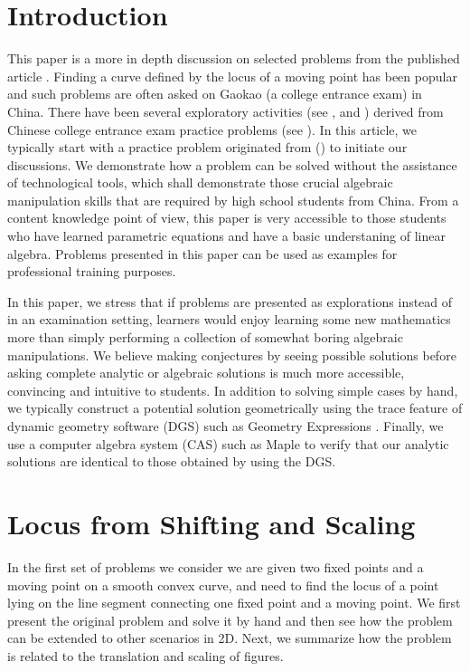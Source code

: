 \documentclass[12pt,a4paper]{article}%
\begin{document}
\section{Introduction} \label{sec1}

This paper is a more in depth discussion on selected problems from the
published article \cite{ATCM2018}. Finding a curve defined by the locus of a
moving point has been popular and such problems are often asked on Gaokao (a college entrance
exam) in China. There have been several exploratory activities (see
\cite{June2017} \cite{MacandYang}, and \cite{YangandS}) derived from Chinese
college entrance exam practice problems (see \cite{Gao}). In this article, we
typically start with a practice problem originated from (\cite{Gao}) to
initiate our discussions. We demonstrate how a problem can be solved without
the assistance of technological tools, which shall demonstrate those crucial
algebraic manipulation skills that are required by high school students from
China. From a content knowledge point of view, this paper is very accessible to
those students who have learned parametric equations and have a basic understaning of
linear algebra. Problems presented in this paper can be used as examples for
professional training purposes.

In this paper, we stress that if problems are presented as explorations instead
of in an examination setting, learners would enjoy learning some new mathematics
more than simply performing a collection of somewhat boring algebraic manipulations.
We believe making
conjectures by seeing possible solutions before asking complete analytic or
algebraic solutions is much more accessible, convincing and intuitive to
students. In addition to solving simple cases by hand, we typically construct
a potential solution geometrically using the trace feature of dynamic geometry
software (DGS) such as Geometry Expressions \cite{GE}.
Finally, we use a computer algebra system (CAS) such as Maple \cite{Maple}
to verify that our analytic solutions are identical to those obtained by using the DGS.

\section{Locus from Shifting and Scaling} \label{sec2}

In the first set of problems we consider we are given two fixed points
and a moving point on a smooth convex
curve, and need to find the locus of a point lying on the line segment
connecting one fixed point and a moving point. We first present the original
problem and solve it by hand and then see how the problem can be extended to
other scenarios in 2D. Next, we summarize how the problem is related to the
translation and scaling of figures.
\end{document}
